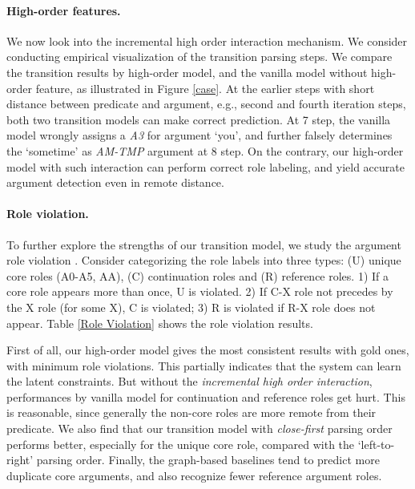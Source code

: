 \documentclass[letterpaper]{article} \usepackage{aaai21}  \usepackage{times}  \usepackage{helvet} \usepackage{courier}  \usepackage[hyphens]{url}  \usepackage{graphicx} \urlstyle{rm} \def\UrlFont{\rm}  \usepackage{natbib}  \usepackage{caption}
\begin{document}
\begin{CJK}{UTF8}{gbsn}
\paragraph{High-order features.}

We now look into the incremental high order interaction mechanism.
We consider conducting empirical visualization of the transition parsing steps.
We compare the transition results by high-order model, and the vanilla model without high-order feature, as illustrated in Figure \ref{case}.
At the earlier steps with short distance between predicate and argument, e.g., second and fourth iteration steps, both two transition models can make correct prediction.
At 7 step, the vanilla model wrongly assigns a \emph{A3} for argument `you', and further falsely determines the `sometime' as \emph{AM-TMP} argument at 8 step.
On the contrary, our high-order model with such interaction can perform correct role labeling, and yield accurate argument detection even in remote distance.







\paragraph{Role violation.}

To further explore the strengths of our transition model, we study the argument role violation \cite{punyakanok-etal-2004-semantic,fitzgerald-etal-2015-semantic,he-etal-2018-jointly}.
Consider categorizing the role labels into three types: (U) unique core roles (A0-A5, AA), (C) continuation roles and (R) reference roles.
1) If a core role appears more than once, U is violated.
2) If C-X role not precedes by the X role (for some X), C is violated;
3) R is violated if R-X role does not appear.
Table \ref{Role Violation} shows the role violation results.



First of all, our high-order model gives the most consistent results with gold ones, with minimum role violations.
This partially indicates that the system can learn the latent constraints.
But without the \emph{incremental high order interaction}, performances by vanilla model for continuation and reference roles get hurt.
This is reasonable, since generally the non-core roles are more remote from their predicate.
We also find that our transition model with \emph{close-first} parsing order performs better, especially for the unique core role, compared with the `left-to-right' parsing order.
Finally, the graph-based baselines tend to predict more duplicate core arguments, and also recognize fewer reference argument roles.










\end{CJK}
\end{document}
